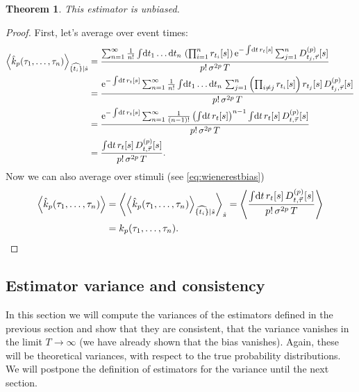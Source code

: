 \documentclass[12pt]{article}
\theoremstyle{slplain}
\newtheorem{thm}{Theorem}
\theoremstyle{sldefinition}
\theoremstyle{remark}
\begin{document}
\begin{thm}
  This estimator is unbiased.
\end{thm}
\begin{proof}
  First, let's average over event times:
  \begin{equation*}
    \begin{aligned}
      \av{\hat{k}_p(\tau_1,\ldots,\tau_n)}_{\widehat{\{t_i\}}|\hat{s}}  &=
        \frac{\sum_{n=1}^\infty  \frac{1}{n!} \intd{t_1\ldots\dr t_n} \prn{\prod_{i=1}^n r_{t_i}[s]} \e^{-\intd{t}r_t[s]} \sum_{j=1}^n D\rp{p}_{t_j,\vec{\tau}}[s] }{ p! \, \sigma^{2p} \, T } \\
        &= \frac{\e^{-\intd{t}r_t[s]} \sum_{n=1}^\infty  \frac{1}{n!} \intd{t_1\ldots\dr t_n} \sum_{j=1}^n \prn{\prod_{i\neq j} r_{t_i}[s]} r_{t_j}[s] \, D\rp{p}_{t_j,\vec{\tau}}[s] }{ p! \, \sigma^{2p} \, T } \\
        &= \frac{\e^{-\intd{t}r_t[s]} \sum_{n=1}^\infty  \frac{1}{(n-1)!}  \prn{\intd{t} r_{t}[s]}^{n-1} \intd{t} r_{t}[s] \, D\rp{p}_{t,\vec{\tau}}[s] }{ p! \, \sigma^{2p} \, T } \\
        &= \frac{ \intd{t} r_{t}[s] \, D\rp{p}_{t,\vec{\tau}}[s] }{ p! \, \sigma^{2p} \, T } .
    \end{aligned}
  \end{equation*}
  Now we can also average over stimuli (see \eqref{eq:wienerestbias})
  \begin{equation*}
    \begin{aligned}
      \av{\hat{k}_p(\tau_1,\ldots,\tau_n)}  &= 
        \av{ \av{\hat{k}_p(\tau_1,\ldots,\tau_n)}_{\widehat{\{t_i\}}|\hat{s}} }_{\hat{s}} 
        = \av{ \frac{ \intd{t} r_{t}[s] \, D\rp{p}_{t,\vec{\tau}}[s] }{ p! \, \sigma^{2p} \, T } } \\
        &=  %
        k_p(\tau_1,\ldots,\tau_n).
    \end{aligned}
  \end{equation*}
\end{proof}


\subsection{Estimator variance and consistency}\label{sec:poissonvar}

In this section we will compute the variances of the estimators defined in the previous section and show that they are consistent, \ie that the variance vanishes in the limit $T\to\infty$ (we have already shown that the bias vanishes). Again, these will be theoretical variances, with respect to the true probability distributions. We will postpone the definition of estimators for the variance until the next section.
\end{document}
